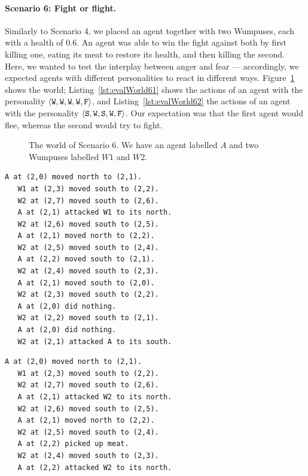 \paragraph{Scenario 6: Fight or flight.} Similarly to Scenario 4, we placed an agent together with two Wumpuses, each with a health of 0.6. An agent was able to win the fight against both by first killing one, eating its meat to restore its health, and then killing the second. Here, we wanted to test the interplay between anger and fear --- accordingly, we expected agents with different personalities to react in different ways. Figure~\ref{fig:evalWorld6} shows the world; Listing~\ref{lst:evalWorld61} shows the actions of an agent with the personality $\langle \mathtt{W},\mathtt{W}, \mathtt{W}, \mathtt{W}, \mathtt{F} \rangle$, and Listing~\ref{lst:evalWorld62} the actions of an agent with the personality $\langle \mathtt{S},\mathtt{W}, \mathtt{S}, \mathtt{W}, \mathtt{F} \rangle$. Our expectation was that the first agent would flee, whereas the second would try to fight.

\begin{figure}[t]
    \centering
    
    \caption{The world of Scenario 6. We have an agent labelled $A$ and two Wumpuses labelled $W1$ and $W2$.}
    \label{fig:evalWorld6}
\end{figure}

\begin{lstlisting}[caption=Actions of an agent with the personality $\personality{W}{W}{W}{W}{F}$ in Scenario 6., label=lst:evalWorld61, float=t]
   A at (2,0) moved north to (2,1).
   W1 at (2,3) moved south to (2,2).
   W2 at (2,7) moved south to (2,6).
   A at (2,1) attacked W1 to its north.
   W2 at (2,6) moved south to (2,5).
   A at (2,1) moved north to (2,2).
   W2 at (2,5) moved south to (2,4).
   A at (2,2) moved south to (2,1).
   W2 at (2,4) moved south to (2,3).
   A at (2,1) moved south to (2,0).
   W2 at (2,3) moved south to (2,2).
   A at (2,0) did nothing.
   W2 at (2,2) moved south to (2,1).
   A at (2,0) did nothing.
   W2 at (2,1) attacked A to its south.
\end{lstlisting}

\begin{lstlisting}[caption=Actions of an agent with the personality $\personality{S}{W}{S}{W}{F}$ in Scenario 6., label=lst:evalWorld62, float=t]
   A at (2,0) moved north to (2,1).
   W1 at (2,3) moved south to (2,2).
   W2 at (2,7) moved south to (2,6).
   A at (2,1) attacked W2 to its north.
   W2 at (2,6) moved south to (2,5).
   A at (2,1) moved north to (2,2).
   W2 at (2,5) moved south to (2,4).
   A at (2,2) picked up meat.
   W2 at (2,4) moved south to (2,3).
   A at (2,2) attacked W2 to its north.
\end{lstlisting}

